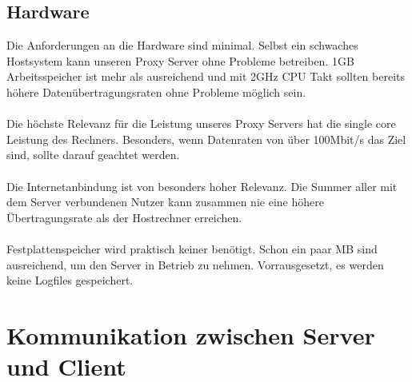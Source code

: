 \subsection{Hardware}
Die Anforderungen an die Hardware sind minimal. Selbst ein schwaches Hostsystem kann unseren  Proxy Server ohne Probleme betreiben. 1GB Arbeitsspeicher ist mehr als ausreichend und mit 2GHz CPU Takt sollten bereits höhere Datenübertragungsraten ohne Probleme möglich sein. 
\\\\ 
Die höchste Relevanz für die Leistung unseres Proxy Servers hat die single core Leistung des Rechners. Besonders, wenn Datenraten von über 100Mbit/s das Ziel sind, sollte darauf geachtet werden.
\\\\
Die Internetanbindung ist von besonders hoher Relevanz. Die Summer aller mit dem Server verbundenen Nutzer kann zusammen nie eine höhere Übertragungsrate als der Hostrechner erreichen. 
\\\\
Festplattenspeicher wird praktisch keiner benötigt. Schon ein paar MB sind ausreichend, um den Server in Betrieb zu nehmen. Vorrausgesetzt, es werden keine Logfiles gespeichert.


\section{Kommunikation zwischen Server und Client}
